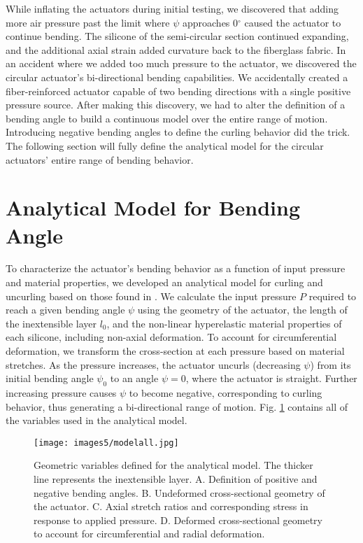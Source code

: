 While inflating the actuators during initial testing, we discovered that adding more air pressure past the limit where $\psi$ approaches 0$^\circ$ caused the actuator to continue bending. The silicone of the semi-circular section continued expanding, and the additional axial strain added curvature back to the fiberglass fabric. In an accident where we added too much pressure to the actuator, we discovered the circular actuator's bi-directional bending capabilities. We accidentally created a fiber-reinforced actuator capable of two bending directions with a single positive pressure source. After making this discovery, we had to alter the definition of a bending angle to build a continuous model over the entire range of motion. Introducing negative bending angles to define the curling behavior did the trick. The following section will fully define the analytical model for the circular actuators' entire range of bending behavior. 

\section{Analytical Model for Bending Angle}

To characterize the actuator's bending behavior as a function of input pressure and material properties, we developed an analytical model for curling and uncurling based on those found in \cite{polygerinos_modeling_2015, connolly_automatic_2017, hu_precurved_2022}. We calculate the input pressure $P$ required to reach a given bending angle $\psi$ using the geometry of the actuator, the length of the inextensible layer $l_0$, and the non-linear hyperelastic material properties of each silicone, including non-axial deformation. To account for circumferential deformation, we transform the cross-section at each pressure based on material stretches. As the pressure increases, the actuator uncurls (decreasing $\psi$) from its initial bending angle $\psi_0$ to an angle $\psi=0$, where the actuator is straight. Further increasing pressure causes $\psi$ to become negative, corresponding to curling behavior, thus generating a bi-directional range of motion. Fig. \ref{fig:modelall} contains all of the variables used in the analytical model. 

\begin{figure}[ht]
    \centering
     \texttt{[image: images5/modelall.jpg]}
    \caption{Geometric variables defined for the analytical model. The thicker line represents the inextensible layer. A. Definition of positive and negative bending angles. B. Undeformed cross-sectional geometry of the actuator. C. Axial stretch ratios and corresponding stress in response to applied pressure. D. Deformed cross-sectional geometry to account for circumferential and radial deformation.}
    \label{fig:modelall}
\end{figure}

